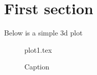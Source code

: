 \section{First section}

Below is a simple 3d plot

\begin{figure}[h]
\centering
{plot1.tex}
\caption{Caption}
\label{fig:my_label}
\end{figure}


\Blindtext